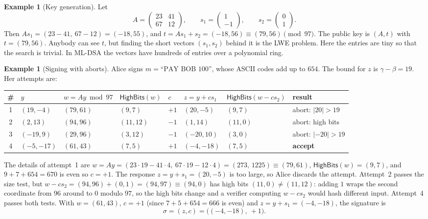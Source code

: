 \documentclass[11pt,a4paper]{article}
\theoremstyle{definition}
\newtheorem{example}[definition]{Example}
\newcommand{\HB}{\mathsf{HighBits}}
\begin{document}
\begin{example}[Key generation]\label{ex:fs-key}
Let
\[
A=\begin{pmatrix}23&41\\67&12\end{pmatrix},\qquad s_1=\begin{pmatrix}1\\-1\end{pmatrix},\qquad s_2=\begin{pmatrix}0\\1\end{pmatrix}.
\]
Then $As_1=(23-41,\ 67-12)=(-18,55)$, and $t=As_1+s_2=(-18,56)\equiv(79,56) \pmod{97}$. The public key is $(A,t)$ with $t=(79,56)$. Anybody can see $t$, but finding the short vectors $(s_1,s_2)$ behind it is the LWE problem. Here the entries are tiny so that the search is trivial. In ML-DSA the vectors have hundreds of entries over a polynomial ring.
\end{example}

\begin{example}[Signing with aborts]\label{ex:fs-sign}
Alice signs $m=\text{``PAY BOB 100''}$, whose ASCII codes add up to $654$. The bound for $z$ is $\gamma-\beta=19$. Her attempts are:

\begin{center}\footnotesize\setlength{\tabcolsep}{3pt}
\begin{tabular}{clllllll}
\toprule
\# & $y$ & $w=Ay \bmod 97$ & $\HB(w)$ & $c$ & $z=y+cs_1$ & $\HB(w-cs_2)$ & result\\
\midrule
1 & $(19,-4)$ & $(79,61)$ & $(9,7)$ & $+1$ & $(20,-5)$ & $(9,7)$ & abort: $|20|>19$\\
2 & $(2,13)$ & $(94,96)$ & $(11,12)$ & $-1$ & $(1,14)$ & $(11,0)$ & abort: high bits\\
3 & $(-19,9)$ & $(29,96)$ & $(3,12)$ & $-1$ & $(-20,10)$ & $(3,0)$ & abort: $|-20|>19$\\
4 & $(-5,-17)$ & $(61,43)$ & $(7,5)$ & $+1$ & $(-4,-18)$ & $(7,5)$ & \textbf{accept}\\
\bottomrule
\end{tabular}
\end{center}

The details of attempt~1 are $w=Ay=(23\cdot 19-41\cdot 4,\ 67\cdot 19-12\cdot 4)=(273,\,1225)\equiv(79,61)$, $\HB(w)=(9,7)$, and $9+7+654=670$ is even so $c=+1$. The response $z=y+s_1=(20,-5)$ is too large, so Alice discards the attempt. Attempt~2 passes the size test, but $w-cs_2=(94,96)+(0,1)=(94,97)\equiv(94,0)$ has high bits $(11,0)\ne(11,12)$: adding $1$ wraps the second coordinate from $96$ around to $0$ modulo $97$, so the high bits change and a verifier computing $w-cs_2$ would hash different input. Attempt~4 passes both tests. With $w=(61,43)$, $c=+1$ (since $7+5+654=666$ is even) and $z=y+s_1=(-4,-18)$, the signature is
\[
\sigma=(z,c)=\big((-4,-18),\ +1\big).
\]
\end{example}
\end{document}
